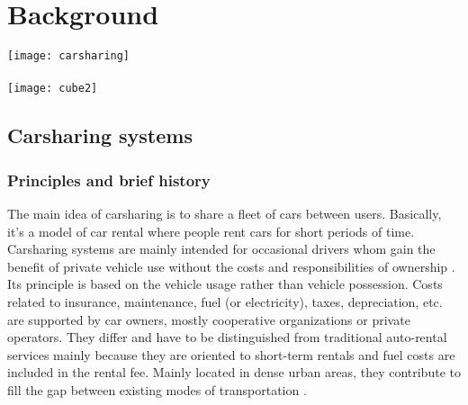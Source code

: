 \chapter{Background} \label{chap:backAndPb} %
\begin{bibunit}[ieeetr]
\minitoc
\vspace{2cm}
%
\noindent
\begin{minipage}[c]{0.3\textwidth}
\centering
\texttt{[image: carsharing]}\\
~\\
\texttt{[image: cube2]}
\end{minipage}
\hfill
\begin{minipage}[c]{0.7\textwidth}
\begin{abstract}
%
%
\end{abstract}
\end{minipage}

\newpage
\section{Carsharing systems} \label{sec:carsharingSystems}

\subsection{Principles and brief history}
The main idea of carsharing is to share a fleet of cars between users.
Basically, it's a model of car rental where people rent cars for short periods of time.
Carsharing systems are mainly intended for occasional drivers whom gain the benefit of private vehicle use without the costs and responsibilities of ownership \cite{shaheen_carsharing_1998}.
Its principle is based on the vehicle usage rather than vehicle possession.
Costs related to insurance, maintenance, fuel (or electricity), taxes, depreciation, etc. are supported by car owners, \ie mostly cooperative organizations or private operators.
They differ and have to be distinguished from traditional auto-rental services mainly because they are oriented to short-term rentals and fuel costs are included in the rental fee.
Mainly located in dense urban areas, they contribute to fill the gap between existing modes of transportation \cite{louvet_enquete_2013}.


\end{bibunit}
